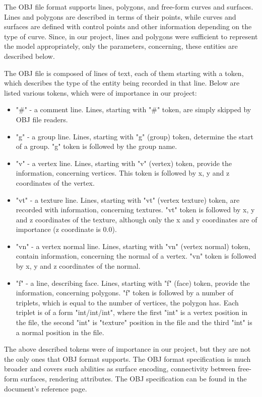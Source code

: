 \documentclass[times, 10pt,twocolumn]{article}
\begin{document}
The OBJ file format supports lines, polygons, and free-form curves and surfaces. Lines and polygons are described in terms of their points, while curves and surfaces are defined with control points and other information depending on the type of curve. Since, in our project, lines and polygons were sufficient to represent the model appropriately, only the parameters, concerning, these entities are described below.

The OBJ file is composed of lines of text, each of them starting with a token, which describes the type of the entity being  recorded in that line. Below are listed various tokens, which were of importance in our project:

\begin{itemize}
\item "\#" - a comment line. Lines, starting with "\#" token, are simply skipped by OBJ file readers.
\item "g" - a group line. Lines, starting with "g" (group) token, determine the start of a group. "g" token is followed by the group name. 
\item "v" - a vertex line. Lines, starting with "v" (vertex) token, provide the information, concerning vertices. This token is followed by x, y and z coordinates of the vertex.
\item "vt" - a texture line. Lines, starting with "vt" (vertex texture) token, are recorded with information, concerning textures. "vt" token is followed by x, y and z coordinates of the texture, although only the x and y coordinates are of importance (z coordinate is 0.0).
\item "vn" - a vertex normal line. Lines, starting with "vn" (vertex normal) token, contain information, concerning the normal of a vertex. "vn" token is followed by x, y and z coordinates of the normal.
\item "f" - a line, describing face. Lines, starting with "f" (face) token, provide the information, concerning polygons. "f" token is followed by a number of triplets, which is equal to the number of vertices, the polygon has. Each triplet is of a form "int/int/int", where the first "int" is a vertex position in the file, the second "int" is "texture" position in the file and the third "int" is a normal position in the file.
\end{itemize}

The above described tokens were of importance in our project, but they are not the only ones that OBJ format supports. The OBJ format specification is much broader and covers such abilities as surface encoding, connectivity between free-form surfaces, rendering attributes. The OBJ specification can be found in the document's reference page.
\end{document}
